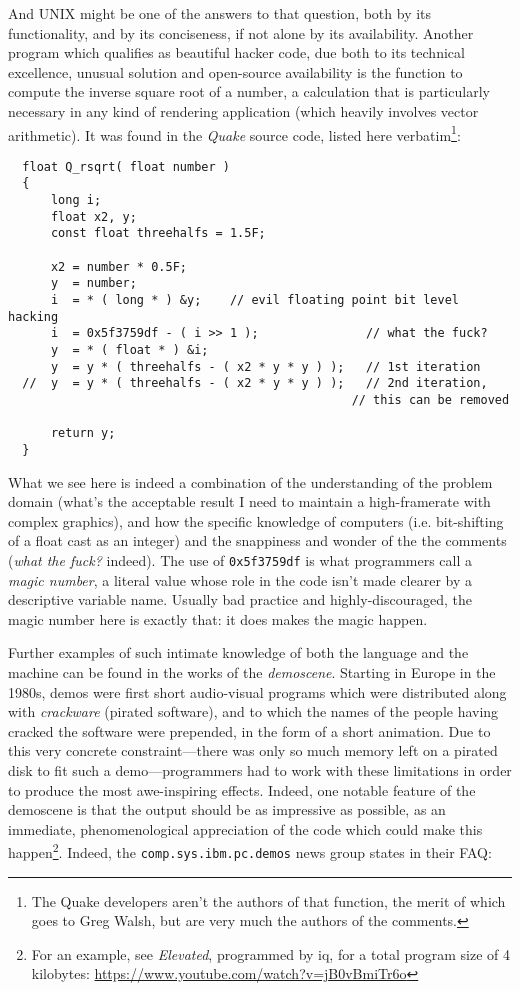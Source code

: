 \documentclass{article}
\begin{document}
And UNIX might be one of the answers to that question, both by its functionality, and by its conciseness, if not alone by its availability. Another program which qualifies as beautiful hacker code, due both to its technical excellence, unusual solution and open-source availability is the function to compute the inverse square root of a number, a calculation that is particularly necessary in any kind of rendering application (which heavily involves vector arithmetic). It was found in the \emph{Quake} source code, listed here verbatim\footnote{The Quake developers aren't the authors of that function, the merit of which goes to Greg Walsh, but are very much the authors of the comments.}:

\pagebreak

\begin{lstlisting}
  float Q_rsqrt( float number )
  {
      long i;
      float x2, y;
      const float threehalfs = 1.5F;

      x2 = number * 0.5F;
      y  = number;
      i  = * ( long * ) &y;    // evil floating point bit level hacking
      i  = 0x5f3759df - ( i >> 1 );               // what the fuck? 
      y  = * ( float * ) &i;
      y  = y * ( threehalfs - ( x2 * y * y ) );   // 1st iteration
  //  y  = y * ( threehalfs - ( x2 * y * y ) );   // 2nd iteration,
                                                // this can be removed

      return y;
  }
\end{lstlisting}

What we see here is indeed a combination of the understanding of the problem domain (what's the acceptable result I need to maintain a high-framerate with complex graphics), and how the specific knowledge of computers (i.e. bit-shifting of a float cast as an integer) and the snappiness and wonder of the the comments (\emph{what the fuck?} indeed). The use of \lstinline{0x5f3759df} is what programmers call a \emph{magic number}, a literal value whose role in the code isn't made clearer by a descriptive variable name. Usually bad practice and highly-discouraged, the magic number here is exactly that: it does makes the magic happen.

Further examples of such intimate knowledge of both the language and the machine can be found in the works of the \emph{demoscene}. Starting in Europe in the 1980s, demos were first short audio-visual programs which were distributed along with \emph{crackware} (pirated software), and to which the names of the people having cracked the software were prepended, in the form of a short animation\cite{reunanen_computer_2010}. Due to this very concrete constraint—there was only so much memory left on a pirated disk to fit such a demo—programmers had to work with these limitations in order to produce the most awe-inspiring effects. Indeed, one notable feature of the demoscene is that the output should be as impressive as possible, as an immediate, phenomenological appreciation of the code which could make this happen\footnote{For an example, see \emph{Elevated}, programmed by iq, for a total program size of 4 kilobytes: \url{https://www.youtube.com/watch?v=jB0vBmiTr6o}}. Indeed, the \lstinline{comp.sys.ibm.pc.demos} news group states in their FAQ:
\end{document}
